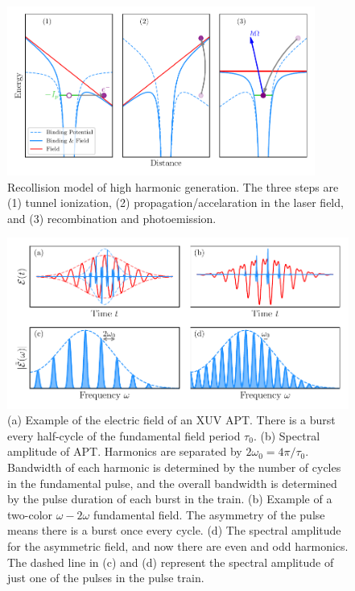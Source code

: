 \begin{figure}
	\centering
	\includegraphics[width=0.9\textwidth]{figures/Introduction/3-step.pdf}
	\caption[Recollision model of high harmonic generation]{Recollision model of high harmonic generation.  The three steps are (1) tunnel ionization, (2) propagation/accelaration in the laser field, and (3) recombination and photoemission.}
	\label{fig:3-step}
\end{figure}

\begin{figure}
	\centering
	\includegraphics[width=1.0\textwidth]{figures/Introduction/time_to_freq.pdf}
	\caption[Example electric field of XUV APT and its frequency spectrum]{(a) Example of the electric field of an XUV APT.  There is a burst every half-cycle of the fundamental field period $\tau_0$.  (b)  Spectral amplitude of APT.  Harmonics are separated by $2\omega_0=4\pi/\tau_0$.  Bandwidth of each harmonic is determined by the number of cycles in the fundamental pulse, and the overall bandwidth is determined by the pulse duration of each burst in the train. (b) Example of a two-color $\omega-2\omega$ fundamental field.  The asymmetry of the pulse means there is a burst once every cycle. (d) The spectral amplitude for the asymmetric field, and now there are even and odd harmonics.  The dashed line in (c) and (d) represent the spectral amplitude of just one of the pulses in the pulse train.}
	\label{fig:time_to_freq}
\end{figure}


